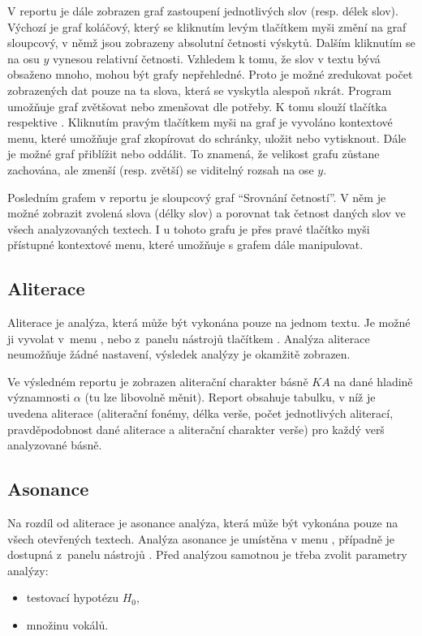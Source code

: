 \documentclass[dp.tex]{subfiles}
\begin{document}
V reportu je dále zobrazen graf zastoupení jednotlivých slov (resp. délek slov). Výchozí je graf koláčový, který se kliknutím levým tlačítkem myši změní na graf sloupcový, v němž jsou zobrazeny absolutní četnosti výskytů. Dalším kliknutím se na osu $y$ vynesou relativní četnosti. Vzhledem k tomu, že slov v textu bývá obsaženo mnoho, mohou být grafy nepřehledné. Proto je možné zredukovat počet zobrazených dat pouze na ta slova, která se vyskytla alespoň $n\text{krát}$. Program umožňuje graf zvětšovat nebo zmenšovat dle potřeby. K tomu slouží tlačítka  respektive . Kliknutím pravým tlačítkem myši na graf je vyvoláno kontextové menu, které umožňuje graf zkopírovat do schránky, uložit nebo vytisknout. Dále je možné graf přiblížit nebo oddálit. To znamená, že velikost grafu zůstane zachována, ale zmenší (resp. zvětší) se viditelný rozsah na ose $y$.

Posledním grafem v reportu je sloupcový graf \enquote{Srovnání četností}. V něm je možné zobrazit zvolená slova (délky slov) a porovnat tak četnost daných slov ve všech analyzovaných textech. I u tohoto grafu je přes pravé tlačítko myši přístupné kontextové menu, které umožňuje s grafem dále manipulovat.

\subsection{Aliterace}

Aliterace je analýza, která může být vykonána pouze na jednom textu. Je možné ji vyvolat v~menu , nebo z~panelu nástrojů tlačítkem . Analýza aliterace neumožňuje žádné nastavení, výsledek analýzy je okamžitě zobrazen. 

Ve výsledném reportu je zobrazen aliterační charakter básně $\mathit{KA}$ na dané hladině významnosti $\alpha$ (tu lze libovolně měnit). Report obsahuje tabulku, v níž je uvedena aliterace (aliterační fonémy, délka verše, počet jednotlivých aliterací, pravděpodobnost dané aliterace a aliterační charakter verše) pro každý verš analyzované básně.
	
\subsection{Asonance}
\label{chap:app_asonance}
Na rozdíl od aliterace je asonance analýza, která může být vykonána pouze na všech otevřených textech. Analýza asonance je umístěna v menu , případně je dostupná z~panelu nástrojů . Před analýzou samotnou je třeba zvolit parametry analýzy:
\begin{itemize}
\item testovací hypotézu $H_0$,
\item množinu vokálů.
\end{itemize}
\end{document}

